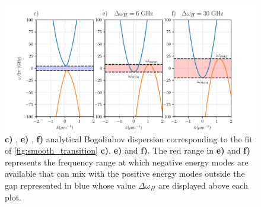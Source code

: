 \begin{figure}[t!]
    \centering
    \includegraphics[width=1\textwidth]{chap_custom_st/fig/max_freq_hawking.pdf}
    \caption{\textbf{c)} , \textbf{e)} , \textbf{f)} analytical Bogoliubov dispersion corresponding to the fit of \autoref{fig:smooth_transition} \textbf{c)}, \textbf{e)} and \textbf{f)}. The red range in \textbf{e)} and \textbf{f)} represents the frequency range at which negative energy modes
    are available that can mix with the positive energy modes outside the gap represented in blue whose value $\Delta \omega_H$ are displayed above each plot.}
    \label{fig:hawking_range}
\end{figure}

